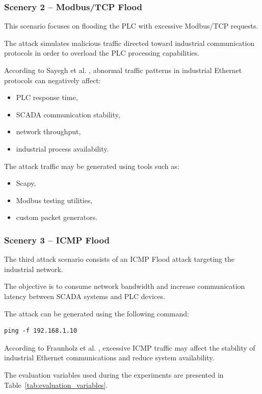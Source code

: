 \documentclass[sigconf]{acmart}
\begin{document}
\subsubsection{Scenery 2 -- Modbus/TCP Flood}

This scenario focuses on flooding the PLC with excessive Modbus/TCP requests.

The attack simulates malicious traffic directed toward industrial communication protocols in order to overload the PLC processing capabilities.

According to Sayegh et al. \cite{sayegh2019ids}, abnormal traffic patterns in industrial Ethernet protocols can negatively affect:
\begin{itemize}
    \item PLC response time,
    \item SCADA communication stability,
    \item network throughput,
    \item industrial process availability.
\end{itemize}

The attack traffic may be generated using tools such as:
\begin{itemize}
    \item Scapy,
    \item Modbus testing utilities,
    \item custom packet generators.
\end{itemize}

\subsubsection{Scenery 3 -- ICMP Flood}

The third attack scenario consists of an ICMP Flood attack targeting the industrial network.

The objective is to consume network bandwidth and increase communication latency between SCADA systems and PLC devices.

The attack can be generated using the following command:

\begin{verbatim}
ping -f 192.168.1.10
\end{verbatim}

According to Fraunholz et al. \cite{fraunholz2018industrial}, excessive ICMP traffic may affect the stability of industrial Ethernet communications and reduce system availability.

The evaluation variables used during the experiments are presented in Table~\ref{tab:evaluation_variables}.
\end{document}
